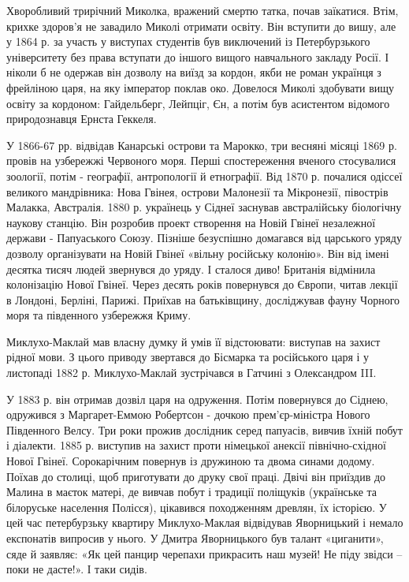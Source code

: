 
Хворобливий трирічний Миколка, вражений смертю татка, почав заїкатися. Втім,
крихке здоров'я не завадило Миколі отримати освіту. Він вступити до вишу, але у
1864 р. за участь у виступах студентів був виключений із Петербурзького
університету без права вступати до іншого вищого навчального закладу Росії. І
ніколи б не одержав він дозволу на виїзд за кордон, якби не роман українця з
фрейліною царя, на яку імператор поклав око. Довелося Миколі здобувати вищу
освіту за кордоном: Гайдельберг, Лейпціг, Єн, а потім був асистентом відомого
природознавця Ернста Геккеля.


У 1866-67 рр. відвідав Канарські острови та Марокко, три весняні місяці 1869 р.
провів на узбережжі Червоного моря. Перші спостереження вченого стосувалися
зоології, потім - географії, антропології й етнографії. Від 1870 р. почалися
одіссеї великого мандрівника: Нова Гвінея, острови Малонезії та Мікронезії,
півострів Малакка, Австралія. 1880 р. українець у Сіднеї заснував австралійську
біологічну наукову станцію. Він розробив проект створення на Новій Гвінеї
незалежної держави - Папуаського Союзу. Пізніше безуспішно домагався від
царського уряду дозволу організувати на Новій Гвінеї «вільну російську
колонію». Він від імені десятка тисяч людей звернувся до уряду. І сталося диво!
Британія відмінила колонізацію Нової Гвінеї. Через десять років повернувся до
Європи, читав лекції в Лондоні, Берліні, Парижі. Приїхав на батьківщину,
досліджував фауну Чорного моря та південного узбережжя Криму.


Миклухо-Маклай мав власну думку й умів її відстоювати: виступав на захист
рідної мови. З цього приводу звертався до Бісмарка та російського царя і у
листопаді 1882 р. Миклухо-Маклай зустрічався в Гатчині з Олександром III.

У 1883 р. він отримав дозвіл царя на одруження. Потім повернувся до Сіднею,
одружився з Маргарет-Еммою Робертсон - дочкою прем'єр-міністра Нового
Південного Велсу. Три роки прожив дослідник серед папуасів, вивчив їхній побут
і діалекти. 1885 р. виступив на захист проти німецької анексії північно-східної
Нової Гвінеї. Сорокарічним повернув із дружиною та двома синами додому. Поїхав
до столиці, щоб приготувати до друку свої праці. Двічі він приїздив до Малина в
маєток матері, де вивчав побут і традиції поліщуків (українське та білоруське
населення Полісся), цікавився походженням древлян, їх історією. У цей час
петербурзьку квартиру Миклухо-Маклая відвідував Яворницький і немало експонатів
випросив у нього. У Дмитра Яворницького був талант «циганити», сяде й заявляє:
«Як цей панцир черепахи прикрасить наш музей! Не піду звідси – поки не дасте!».
І таки сидів.

